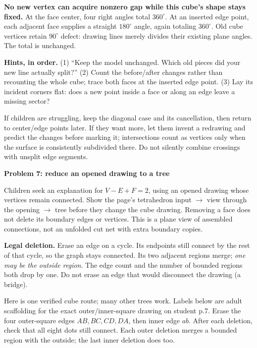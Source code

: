 \documentclass[11pt,letterpaper]{article}
\newcommand{\titleline}[1]{\par{\Large\bfseries #1}\par\vspace{4pt}}
\newcommand{\sub}[1]{\par\vspace{3pt}{\bfseries #1}\par}
\newcommand{\hints}[3]{\textbf{Hints, in order.} (1) #1 (2) #2 (3) #3\par}
\newcommand{\degc}{^{\circ}}
\begin{document}
\textbf{No new vertex can acquire nonzero gap while this cube's shape stays fixed.} At the face center, four right angles total $360\degc$. At an inserted edge point, each adjacent face supplies a straight $180\degc$ angle, again totaling $360\degc$. Old cube vertices retain $90\degc$ defect: drawing lines merely divides their existing plane angles. The total is unchanged.

\hints{``Keep the model unchanged. Which old pieces did your new line actually split?''}{Count the before/after changes rather than recounting the whole cube; trace both faces at the inserted edge point.}{Lay its incident corners flat: does a new point inside a face or along an edge leave a missing sector?}
If children are struggling, keep the diagonal case and its cancellation, then return to center/edge points later. If they want more, let them invent a redrawing and predict the changes before marking it; intersections count as vertices only when the surface is consistently subdivided there. Do not silently combine crossings with unsplit edge segments.

\newpage
\titleline{Problem 7: reduce an opened drawing to a tree}
\sub{Student p.7 / Grades 4--5 continuation}
Children seek an explanation for $V-E+F=2$, using an opened drawing whose vertices remain connected. Show the page's tetrahedron input $\rightarrow$ view through the opening $\rightarrow$ tree before they change the cube drawing. Removing a face does not delete its boundary edges or vertices. This is a plane view of assembled connections, not an unfolded cut net with extra boundary copies.

\textbf{Legal deletion.} Erase an edge on a cycle. Its endpoints still connect by the rest of that cycle, so the graph stays connected. Its two adjacent regions merge; \emph{one may be the outside region}. The edge count and the number of bounded regions both drop by one. Do not erase an edge that would disconnect the drawing (a bridge).

Here is one verified cube route; many other trees work. Labels below are adult scaffolding for the exact outer/inner-square drawing on student p.7. Erase the four outer-square edges $AB,BC,CD,DA$, then inner edge $ab$. After each deletion, check that all eight dots still connect. Each outer deletion merges a bounded region with the outside; the last inner deletion does too.
\end{document}
